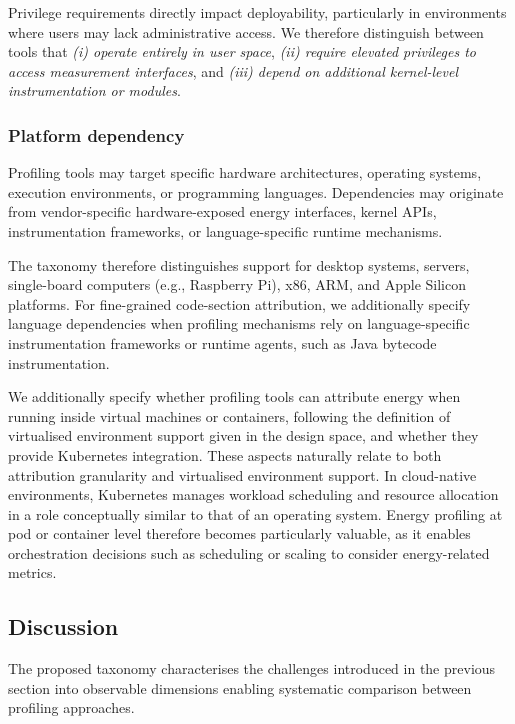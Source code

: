 \documentclass[
  acmsmall,
  screen,
  review,
  xcolor={dvipsnames,usenames}
]{acmart}
\begin{document}
Privilege requirements directly impact deployability, particularly in environments where users may lack administrative access. We therefore distinguish between tools that \emph{(i) operate entirely in user space}, \emph{(ii) require elevated privileges to access measurement interfaces}, and \emph{(iii) depend on additional kernel-level instrumentation or modules}.

\subsubsection{\textbf{Platform dependency}}

Profiling tools may target specific hardware architectures, operating systems, execution environments, or programming languages. Dependencies may originate from vendor-specific hardware-exposed energy interfaces, kernel APIs, instrumentation frameworks, or language-specific runtime mechanisms.

The taxonomy therefore distinguishes support for desktop systems, servers, single-board computers (e.g., Raspberry Pi), x86, ARM, and Apple Silicon platforms. For fine-grained code-section attribution, we additionally specify language dependencies when profiling mechanisms rely on language-specific instrumentation frameworks or runtime agents, such as Java bytecode instrumentation.

We additionally specify whether profiling tools can attribute energy when running inside virtual machines or containers, following the definition of virtualised environment support given in the design space, and whether they provide Kubernetes integration. These aspects naturally relate to both attribution granularity and virtualised environment support. In cloud-native environments, Kubernetes manages workload scheduling and resource allocation in a role conceptually similar to that of an operating system. Energy profiling at pod or container level therefore becomes particularly valuable, as it enables orchestration decisions such as scheduling or scaling to consider energy-related metrics.

\subsection{Discussion} \label{sec:taxonomy-discussion}

The proposed taxonomy characterises the challenges introduced in the previous section into observable dimensions enabling systematic comparison between profiling approaches.
\end{document}
